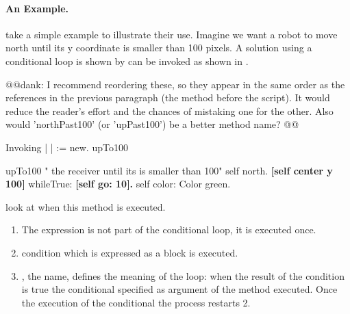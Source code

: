 {\paragraph{An Example.}  take a simple example to illustrate their use.  Imagine we want a robot to move  north until its y coordinate is smaller than 100 pixels.  A solution using a conditional loop is shown by  can be invoked as shown in .

@@dank: I recommend reordering these, so they appear in the same order as the references in the previous paragraph (the method before the script). It would reduce the reader's effort and the chances of mistaking one for the other.  Also would 'northPast100' (or 'upPast100') be a better method name? @@
\begin{scriptwithtitle}{Invoking }\label{scr:upto}
| \caro |
\caro := \Turtle new.
\caro upTo100
\end{scriptwithtitle}

\begin{method}\label{mth:upto}
upTo100
   " the receiver  until its  is smaller than 100"
   self north.
   \textbf{[self center y \replace{>}{>=} 100]}
      whileTrue: \textbf{[self go: 10].}
   self color: Color green.
\end{method}

 look  at  when this method is executed. 
\begin{enumerate}
\item The expression  is not part of the conditional loop,  it is executed once. 

\item {} condition\add{,} which is expressed as a block is executed.  


\item {}, the  name,  defines the meaning of the loop:  when the result of the condition is true the conditional  specified as argument of the method  executed.  Once the execution of the conditional  the process restarts  2.


\end{enumerate}}
